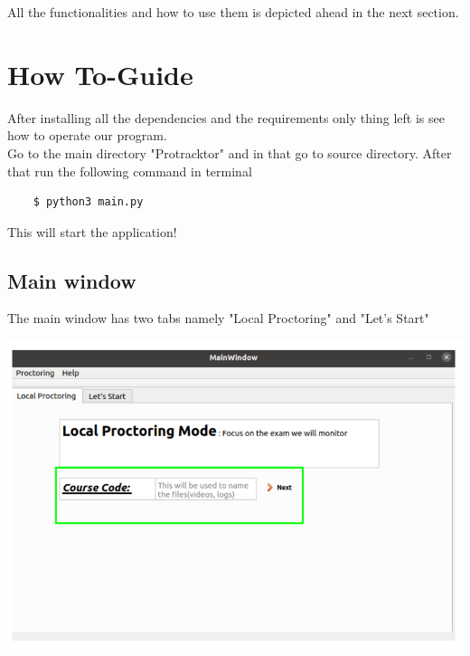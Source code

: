 \documentclass{article}
\begin{document}
All the functionalities and how to use them is depicted ahead in the next section.

\section{How To-Guide}

After installing all the dependencies and the requirements only thing left is see how to operate our program.\\
Go to the main directory "Protracktor" and in that go to source directory. After that run the following command in terminal
\begin{verbatim}
    $ python3 main.py
\end{verbatim}
This will start the application!
\subsection{Main window}
The main window has two tabs namely "Local Proctoring" and "Let's Start"\\
\begin{center}
\includegraphics[scale=0.8]{MainWindow.png}    
\end{center}
\end{document}
